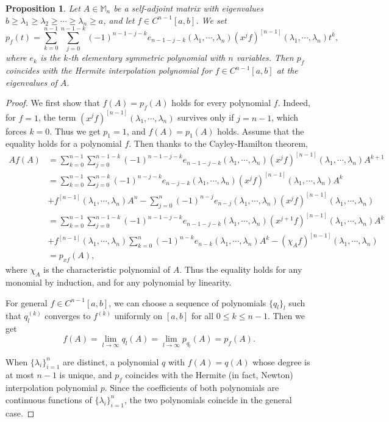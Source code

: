 \documentclass[12pt]{article}
\newtheorem{proposition}[theorem]{Proposition}
\theoremstyle{definition}
\numberwithin{equation}{section}
\newcommand{\M}{\mathbb{M}}
\begin{document}
\begin{proposition}\label{symmetric formula}
Let $A\in \M_n$ be a self-adjoint matrix with eigenvalues $b\geq \lambda_1\geq \lambda_2\geq \cdots \geq \lambda_n\geq a$,  
and let $f\in C^{n-1}[a,b]$. 
We set 
\[p_f(t)=\sum_{k=0}^{n-1}\sum_{j=0}^{n-1-k}(-1)^{n-1-j-k}e_{n-1-j-k}(\lambda_1,\cdots,\lambda_n)
(x^jf)^{[n-1]}(\lambda_1,\cdots,\lambda_n)t^k,\]
where $e_k$ is the $k$-th elementary symmetric polynomial with $n$ variables.  
Then $p_f$ coincides with the Hermite interpolation polynomial for $f\in C^{n-1}[a,b]$ at the eigenvalues of $A$.  
\end{proposition}

\begin{proof} We first show that $f(A)=p_f(A)$ holds for every polynomial $f$. 
Indeed, for $f=1$, the term $(x^jf)^{[n-1]}(\lambda_1,\cdots,\lambda_n)$ survives only if $j=n-1$, which forces $k=0$. 
Thus we get $p_1=1$, and $f(A)=p_1(A)$ holds. 
Assume that the equality holds for a polynomial $f$.  
Then thanks to the Cayley-Hamilton theorem,  
\begin{align*}
Af(A) &=\sum_{k=0}^{n-1}\sum_{j=0}^{n-1-k}(-1)^{n-1-j-k}e_{n-1-j-k}(\lambda_1,\cdots,\lambda_n)(x^jf)^{[n-1]}(\lambda_1,\cdots,\lambda_n)A^{k+1} \\
 &=\sum_{k=0}^{n-1}\sum_{j=0}^{n-k}(-1)^{n-j-k}e_{n-j-k}(\lambda_1,\cdots,\lambda_n)(x^jf)^{[n-1]}(\lambda_1,\cdots,\lambda_n)A^{k} \\
 &+f^{[n-1]}(\lambda_1,\cdots,\lambda_n)A^{n}- \sum_{j=0}^{n}(-1)^{n-j}e_{n-j}(\lambda_1,\cdots,\lambda_n)(x^jf)^{[n-1]}(\lambda_1,\cdots,\lambda_n)\\
 &=\sum_{k=0}^{n-1}\sum_{j=0}^{n-1-k}(-1)^{n-1-j-k}e_{n-1-j-k}(\lambda_1,\cdots,\lambda_n)(x^{j+1}f)^{[n-1]}(\lambda_1,\cdots,\lambda_n)A^{k} \\
 &+f^{[n-1]}(\lambda_1,\cdots,\lambda_n)\sum_{k=0}^n(-1)^{n-k}e_{n-k}(\lambda_1,\cdots,\lambda_n)A^{k}-(\chi_Af)^{[n-1]}(\lambda_1,\cdots,\lambda_n)\\
 &=p_{xf}(A),
\end{align*}
where $\chi_A$ is the characteristic polynomial of $A$. 
Thus the equality holds for any monomial by induction, and for any polynomial by linearity. 

For general $f\in C^{n-1}[a,b]$, we can choose a sequence of polynomials $\{q_l\}_l$ such that $q_l^{(k)}$ converges to $f^{(k)}$ 
uniformly on $[a,b]$ for all $0\leq k\leq n-1$. 
Then we get 
\[f(A)=\lim_{l\to\infty}q_l(A)=\lim_{l\to\infty}p_{q_l}(A)=p_f(A).\]

When $\{\lambda_i\}_{i=1}^n$ are distinct, a polynomial $q$ with $f(A)=q(A)$ whose degree is at most $n-1$ is unique, 
and $p_f$ coincides with the Hermite (in fact, Newton) interpolation polynomial $p$. 
Since the coefficients of both polynomials are continuous functions of $\{\lambda_i\}_{i=1}^n$, 
the two polynomials coincide in the general case. 
\end{proof}
\end{document}
